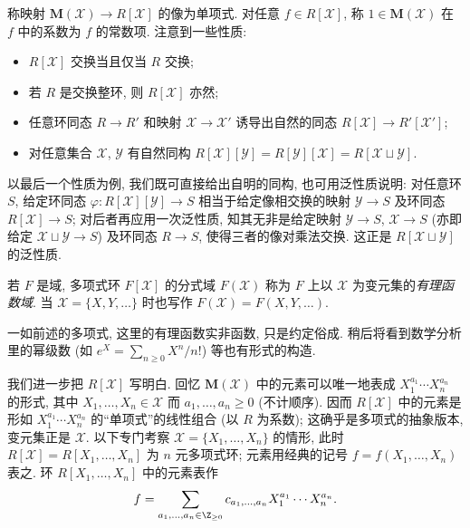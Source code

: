 称映射 $\mathbf{M}(\mathcal{X}) \to R[\mathcal{X}]$ 的像为单项式. 对任意 $f \in R[\mathcal{X}]$, 称 $1 \in \mathbf{M}(\mathcal{X})$ 在 $f$ 中的系数为 $f$ 的常数项. 注意到一些性质:
\begin{itemize}
	\item $R[\mathcal{X}]$ 交换当且仅当 $R$ 交换;
	\item 若 $R$ 是交换整环, 则 $R[\mathcal{X}]$ 亦然;
	\item 任意环同态 $R \to R'$ 和映射 $\mathcal{X} \to \mathcal{X}'$ 诱导出自然的同态 $R[\mathcal{X}] \to R'[\mathcal{X}']$;
	\item 对任意集合 $\mathcal{X}$, $\mathcal{Y}$ 有自然同构 $R[\mathcal{X}][\mathcal{Y}] = R[\mathcal{Y}][\mathcal{X}] = R[\mathcal{X} \sqcup \mathcal{Y}]$.
\end{itemize}
以最后一个性质为例, 我们既可直接给出自明的同构, 也可用泛性质说明: 对任意环 $S$, 给定环同态 $\varphi: R[\mathcal{X}][\mathcal{Y}] \to S$ 相当于给定像相交换的映射 $\mathcal{Y} \to S$ 及环同态 $R[\mathcal{X}] \to S$; 对后者再应用一次泛性质, 知其无非是给定映射 $\mathcal{Y} \to S$, $\mathcal{X} \to S$ (亦即给定 $\mathcal{X} \sqcup \mathcal{Y} \to S$) 及环同态 $R \to S$, 使得三者的像对乘法交换. 这正是 $R[\mathcal{X} \sqcup \mathcal{Y}]$ 的泛性质.

\begin{definition}[有理函数域]
	若 $F$ 是域, 多项式环 $F[\mathcal{X}]$ 的分式域 $F(\mathcal{X})$ 称为 $F$ 上以 $\mathcal{X}$ 为变元集的\emph{有理函数域}. 当 $\mathcal{X} = \{X, Y, \ldots\}$ 时也写作 $F(\mathcal{X}) = F(X, Y, \ldots)$.
\end{definition}
一如前述的多项式, 这里的有理函数实非函数, 只是约定俗成. 稍后将看到数学分析里的幂级数 (如 $e^X = \sum_{n \geq 0} X^n/n!$) 等也有形式的构造.

我们进一步把 $R[\mathcal{X}]$ 写明白. 回忆 $\mathbf{M}(\mathcal{X})$ 中的元素可以唯一地表成 $X_1^{a_1} \cdots X_n^{a_n}$ 的形式, 其中 $X_1, \ldots, X_n \in \mathcal{X}$ 而 $a_1, \ldots, a_n \geq 0$ (不计顺序). 因而 $R[\mathcal{X}]$ 中的元素是形如 $X_1^{a_1} \cdots X_n^{a_n}$ 的``单项式''的线性组合 (以 $R$ 为系数); 这确乎是多项式的抽象版本, 变元集正是 $\mathcal{X}$. 以下专门考察 $\mathcal{X} = \{X_1, \ldots, X_n\}$ 的情形, 此时 $R[\mathcal{X}] = R[X_1, \ldots, X_n]$ 为 $n$ 元多项式环; 元素用经典的记号 $f = f(X_1, \ldots, X_n)$ 表之. 环 $R[X_1, \ldots, X_n]$ 中的元素表作
\[ f = \sum_{a_1, \ldots, a_n \in \Z_{\geq 0}} c_{a_1, \ldots, a_n} X_1^{a_1} \cdots X_n^{a_n}. \]

